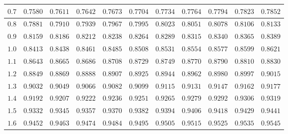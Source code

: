 \begin{customTableWrapper}{1.3}
\begin{longtable}{|l|l|l|l|l|l|l|l|l|l|l|}
    $\mathbf{0.7}$  & ${0.7580}$   & ${0.7611}$   & ${0.7642}$   & ${0.7673}$   & ${0.7704}$   & ${0.7734}$   & ${0.7764}$   & ${0.7794}$   & ${0.7823}$   & ${0.7852}$   \\ \hline
    
    $\mathbf{0.8}$  & ${0.7881}$   & ${0.7910}$   & ${0.7939}$   & ${0.7967}$   & ${0.7995}$   & ${0.8023}$   & ${0.8051}$   & ${0.8078}$   & ${0.8106}$   & ${0.8133}$   \\ \hline
    
    $\mathbf{0.9}$  & ${0.8159}$   & ${0.8186}$   & ${0.8212}$   & ${0.8238}$   & ${0.8264}$   & ${0.8289}$   & ${0.8315}$   & ${0.8340}$   & ${0.8365}$   & ${0.8389}$   \\ \hline
    
    $\mathbf{1.0}$  & ${0.8413}$   & ${0.8438}$   & ${0.8461}$   & ${0.8485}$   & ${0.8508}$   & ${0.8531}$   & ${0.8554}$   & ${0.8577}$   & ${0.8599}$   & ${0.8621}$   \\ \hline
    
    $\mathbf{1.1}$  & ${0.8643}$   & ${0.8665}$   & ${0.8686}$   & ${0.8708}$   & ${0.8729}$   & ${0.8749}$   & ${0.8770}$   & ${0.8790}$   & ${0.8810}$   & ${0.8830}$   \\ \hline
    
    $\mathbf{1.2}$  & ${0.8849}$   & ${0.8869}$   & ${0.8888}$   & ${0.8907}$   & ${0.8925}$   & ${0.8944}$   & ${0.8962}$   & ${0.8980}$   & ${0.8997}$   & ${0.9015}$   \\ \hline
    
    $\mathbf{1.3}$  & ${0.9032}$   & ${0.9049}$   & ${0.9066}$   & ${0.9082}$   & ${0.9099}$   & ${0.9115}$   & ${0.9131}$   & ${0.9147}$   & ${0.9162}$   & ${0.9177}$   \\ \hline
    
    $\mathbf{1.4}$  & ${0.9192}$   & ${0.9207}$   & ${0.9222}$   & ${0.9236}$   & ${0.9251}$   & ${0.9265}$   & ${0.9279}$   & ${0.9292}$   & ${0.9306}$   & ${0.9319}$   \\ \hline
    
    $\mathbf{1.5}$  & ${0.9332}$   & ${0.9345}$   & ${0.9357}$   & ${0.9370}$   & ${0.9382}$   & ${0.9394}$   & ${0.9406}$   & ${0.9418}$   & ${0.9429}$   & ${0.9441}$   \\ \hline
    
    $\mathbf{1.6}$  & ${0.9452}$   & ${0.9463}$   & ${0.9474}$   & ${0.9484}$   & ${0.9495}$   & ${0.9505}$   & ${0.9515}$   & ${0.9525}$   & ${0.9535}$   & ${0.9545}$   \\ \hline
    

\end{longtable}
\end{customTableWrapper}
